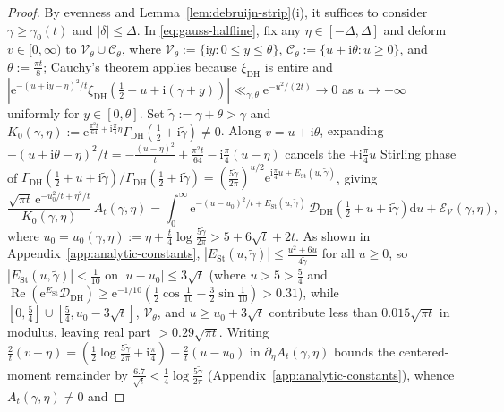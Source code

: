\documentclass[11pt,a4paper,reqno]{amsart}
\theoremstyle{definition}
\theoremstyle{remark}
\numberwithin{equation}{section}
\newcommand{\dd}{\mathrm{d}}
\newcommand{\ii}{\mathrm{i}}
\newcommand{\ee}{\mathrm{e}}
\DeclareMathOperator{\Reop}{Re}
\begin{document}
\begin{proof}
By evenness and Lemma~\ref{lem:debruijn-strip}(i), it suffices to consider $\gamma \ge \gamma_0(t)$ and $|\delta| \le \Delta$. In \eqref{eq:gauss-halfline}, fix any $\eta \in [-\Delta, \Delta]$ and deform $v \in [0,\infty)$ to $\mathcal{V}_\theta \cup \mathcal{C}_\theta$, where $\mathcal{V}_\theta := \{\ii y : 0 \le y \le \theta\}$, $\mathcal{C}_\theta := \{u + \ii\theta : u \ge 0\}$, and $\theta := \frac{\pi t}{8}$; Cauchy's theorem applies because $\xi_{\mathrm{DH}}$ is entire and $|\ee^{-(u+\ii y-\eta)^2/t}\xi_{\mathrm{DH}}(\frac{1}{2}+u+\ii(\gamma+y))| \ll_{\gamma,\theta} \ee^{-u^2/(2t)} \to 0$ as $u \to +\infty$ uniformly for $y \in [0,\theta]$. Set $\tilde{\gamma} := \gamma + \theta > \gamma$ and $K_0(\gamma,\eta) := \ee^{\frac{\pi^2 t}{64} + \ii\frac{\pi}{4}\eta}\Gamma_{\mathrm{DH}}(\frac{1}{2} + \ii\tilde{\gamma}) \ne 0$. Along $v = u + \ii\theta$, expanding $-(u + \ii\theta - \eta)^2/t = -\frac{(u-\eta)^2}{t} + \frac{\pi^2 t}{64} - \ii\frac{\pi}{4}(u - \eta)$ cancels the $+\ii\frac{\pi}{4}u$ Stirling phase of $\Gamma_{\mathrm{DH}}(\frac{1}{2} + u + \ii\tilde{\gamma}) / \Gamma_{\mathrm{DH}}(\frac{1}{2} + \ii\tilde{\gamma}) = (\frac{5\tilde{\gamma}}{2\pi})^{u/2}\ee^{\ii\frac{\pi}{4}u + E_{\mathrm{St}}(u,\tilde{\gamma})}$, giving
\begin{equation}
  \frac{\sqrt{\pi t}\,\ee^{-u_0^2/t + \eta^2/t}}{K_0(\gamma,\eta)}\,A_t(\gamma,\eta)
  = \int_{0}^{\infty} \ee^{-(u - u_0)^2/t + E_{\mathrm{St}}(u,\tilde{\gamma})}\,\mathcal{D}_{\mathrm{DH}}\!\left(\tfrac{1}{2} + u + \ii\tilde{\gamma}\right)\dd u + \mathcal{E}_{\mathcal{V}}(\gamma,\eta),
  \label{eq:shifted-A}
\end{equation}
where $u_0 = u_0(\gamma,\eta) := \eta + \frac{t}{4}\log\frac{5\tilde{\gamma}}{2\pi} > 5 + 6\sqrt{t} + 2t$. As shown in Appendix~\ref{app:analytic-constants}, $|E_{\mathrm{St}}(u,\tilde{\gamma})| \le \frac{u^2 + 6u}{4\tilde{\gamma}}$ for all $u \ge 0$, so $|E_{\mathrm{St}}(u,\tilde{\gamma})| < \frac{1}{10}$ on $|u - u_0| \le 3\sqrt{t}$ (where $u > 5 > \frac{5}{4}$ and $\Reop(\ee^{E_{\mathrm{St}}}\mathcal{D}_{\mathrm{DH}}) \ge \ee^{-1/10}(\frac{1}{2}\cos\frac{1}{10} - \frac{3}{2}\sin\frac{1}{10}) > 0.31$), while $[0, \frac{5}{4}] \cup [\frac{5}{4}, u_0 - 3\sqrt{t}]$, $\mathcal{V}_\theta$, and $u \ge u_0 + 3\sqrt{t}$ contribute less than $0.015\sqrt{\pi t}$ in modulus, leaving real part $> 0.29\sqrt{\pi t}$. Writing $\frac{2}{t}(v - \eta) = (\frac{1}{2}\log\frac{5\tilde{\gamma}}{2\pi} + \ii\frac{\pi}{4}) + \frac{2}{t}(u - u_0)$ in $\partial_\eta A_t(\gamma,\eta)$ bounds the centered-moment remainder by $\frac{6.7}{\sqrt{t}} < \frac{1}{4}\log\frac{5\tilde{\gamma}}{2\pi}$ (Appendix~\ref{app:analytic-constants}), whence $A_t(\gamma,\eta) \ne 0$ and

\end{proof}
\end{document}
